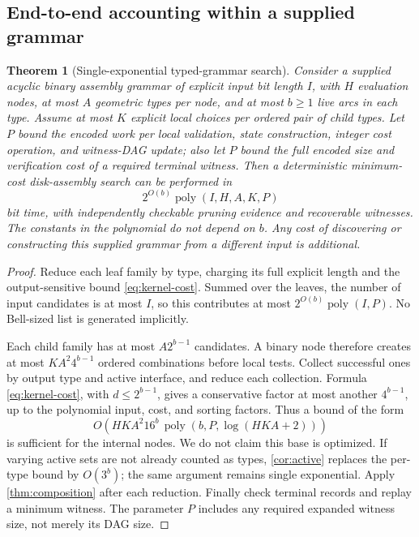 \documentclass[11pt,a4paper]{article}
\newtheorem{theorem}{Theorem}[section]
\theoremstyle{definition}
\theoremstyle{remark}
\newcommand{\poly}{\operatorname{poly}}
\begin{document}
\subsection{End-to-end accounting within a supplied grammar}
\begin{theorem}[Single-exponential typed-grammar search]\label{thm:complexity}
Consider a supplied acyclic binary assembly grammar of explicit input bit length $I$,
with $H$ evaluation nodes, at most $A$ geometric types per node, and at most $b\ge1$
live arcs in each type. Assume at most $K$ explicit local choices per ordered pair
of child types. Let $P$ bound the encoded work per local validation, state construction,
integer cost operation, and witness-DAG update; also let $P$ bound the full encoded
size and verification cost of a required terminal witness. Then a
deterministic minimum-cost disk-assembly search can be performed in
\begin{equation}
                         2^{O(b)}\poly(I,H,A,K,P)
                         \label{eq:grammar-bound}
\end{equation}
bit time, with independently checkable pruning evidence and recoverable witnesses.
The constants in the polynomial do not depend on $b$. Any cost of discovering or
constructing this supplied grammar from a different input is additional.
\end{theorem}
\begin{proof}
Reduce each leaf family by type, charging its full explicit length and the
output-sensitive bound \eqref{eq:kernel-cost}. Summed over the leaves, the number
of input candidates is at most $I$, so this contributes at most
$2^{O(b)}\poly(I,P)$. No Bell-sized list is generated implicitly.

Each child family has at most $A2^{b-1}$ candidates. A binary node therefore creates
at most $KA^2 4^{b-1}$ ordered combinations before local tests. Collect successful
ones by output type and active interface, and reduce each collection. Formula
\eqref{eq:kernel-cost}, with $d\le2^{b-1}$, gives a conservative factor at most
another $4^{b-1}$, up to the polynomial input, cost, and sorting factors. Thus a
bound of the form
\[
                 O\!\left(HKA^2 16^b\,\poly(b,P,\log(HKA+2))\right)
\]
is sufficient for the internal nodes. We do not claim this base is optimized.
If varying active sets are not already counted as types, \cref{cor:active}
replaces the per-type bound by $O(3^b)$; the same argument remains single
exponential. Apply \cref{thm:composition} after each reduction. Finally check
terminal records and replay a minimum witness. The parameter $P$ includes any
required expanded witness size, not merely its DAG size.
\end{proof}
\end{document}
